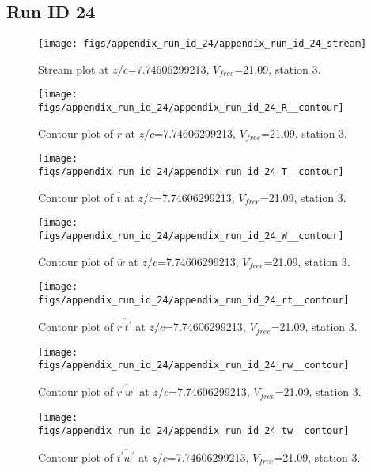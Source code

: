 \subsection{Run ID 24}
\begin{figure}[H]
\centering
\texttt{[image: figs/appendix\_run\_id\_24/appendix\_run\_id\_24\_stream]}
\caption{Stream plot at $z/c$=7.74606299213, $V_{free}$=21.09, station 3.}
\label{fig:appendix_run_id_24_stream}
\end{figure}


\begin{figure}[H]
\centering
\texttt{[image: figs/appendix\_run\_id\_24/appendix\_run\_id\_24\_R\_\_contour]}
\caption{Contour plot of $\overline{r}$ at $z/c$=7.74606299213, $V_{free}$=21.09, station 3.}
\label{fig:appendix_run_id_24_R__contour}
\end{figure}


\begin{figure}[H]
\centering
\texttt{[image: figs/appendix\_run\_id\_24/appendix\_run\_id\_24\_T\_\_contour]}
\caption{Contour plot of $\overline{t}$ at $z/c$=7.74606299213, $V_{free}$=21.09, station 3.}
\label{fig:appendix_run_id_24_T__contour}
\end{figure}


\begin{figure}[H]
\centering
\texttt{[image: figs/appendix\_run\_id\_24/appendix\_run\_id\_24\_W\_\_contour]}
\caption{Contour plot of $\overline{w}$ at $z/c$=7.74606299213, $V_{free}$=21.09, station 3.}
\label{fig:appendix_run_id_24_W__contour}
\end{figure}


\begin{figure}[H]
\centering
\texttt{[image: figs/appendix\_run\_id\_24/appendix\_run\_id\_24\_rt\_\_contour]}
\caption{Contour plot of $\overline{r^\prime t^\prime}$ at $z/c$=7.74606299213, $V_{free}$=21.09, station 3.}
\label{fig:appendix_run_id_24_rt__contour}
\end{figure}


\begin{figure}[H]
\centering
\texttt{[image: figs/appendix\_run\_id\_24/appendix\_run\_id\_24\_rw\_\_contour]}
\caption{Contour plot of $\overline{r^\prime w^\prime}$ at $z/c$=7.74606299213, $V_{free}$=21.09, station 3.}
\label{fig:appendix_run_id_24_rw__contour}
\end{figure}


\begin{figure}[H]
\centering
\texttt{[image: figs/appendix\_run\_id\_24/appendix\_run\_id\_24\_tw\_\_contour]}
\caption{Contour plot of $\overline{t^\prime w^\prime}$ at $z/c$=7.74606299213, $V_{free}$=21.09, station 3.}
\label{fig:appendix_run_id_24_tw__contour}
\end{figure}


